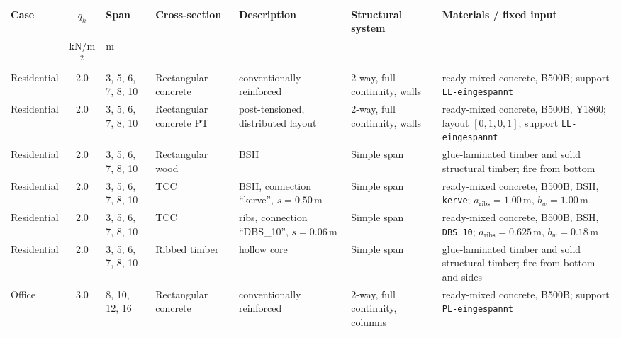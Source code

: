 \begin{table}[t]
    \centering
    \begingroup
    \scriptsize
    \setlength{\tabcolsep}{2.5pt}
    \renewcommand{\arraystretch}{1.15}
    \begin{tabularx}{\textwidth}{@{}l|c|l|X|X|X|X@{}}
    \hline
    \textbf{Case} &
    \textbf{$q_k$} &
    \textbf{Span} &
    \textbf{Cross-section} &
    \textbf{Description} &
    \textbf{Structural system} &
    \textbf{Materials / fixed input} \\
    & kN/m$^2$ & m & & & & \\ \hline
    Residential & 2.0 & 3, 5, 6, 7, 8, 10 &
    Rectangular concrete &
    conventionally reinforced &
    2-way, full continuity, walls &
    ready-mixed concrete, B500B; support \texttt{LL-eingespannt} \\

    Residential & 2.0 & 3, 5, 6, 7, 8, 10 &
    Rectangular concrete PT &
    post-tensioned, distributed layout &
    2-way, full continuity, walls &
    ready-mixed concrete, B500B, Y1860; layout $[0,1,0,1]$; support \texttt{LL-eingespannt} \\

    Residential & 2.0 & 3, 5, 6, 7, 8, 10 &
    Rectangular wood &
    BSH &
    Simple span &
    glue-laminated timber and solid structural timber; fire from bottom \\

    Residential & 2.0 & 3, 5, 6, 7, 8, 10 &
    TCC &
    BSH, connection ``kerve'', $s=0.50$\,m &
    Simple span &
    ready-mixed concrete, B500B, BSH, \texttt{kerve}; $a_{\mathrm{ribs}}=1.00$\,m, $b_w=1.00$\,m \\

    Residential & 2.0 & 3, 5, 6, 7, 8, 10 &
    TCC &
    ribs, connection ``DBS\_10'', $s=0.06$\,m &
    Simple span &
    ready-mixed concrete, B500B, BSH, \texttt{DBS\_10}; $a_{\mathrm{ribs}}=0.625$\,m, $b_w=0.18$\,m \\

    Residential & 2.0 & 3, 5, 6, 7, 8, 10 &
    Ribbed timber &
    hollow core &
    Simple span &
    glue-laminated timber and solid structural timber; fire from bottom and sides \\

    Office & 3.0 & 8, 10, 12, 16 &
    Rectangular concrete &
    conventionally reinforced &
    2-way, full continuity, columns &
    ready-mixed concrete, B500B; support \texttt{PL-eingespannt} \\


\end{tabularx}
\end{table}
